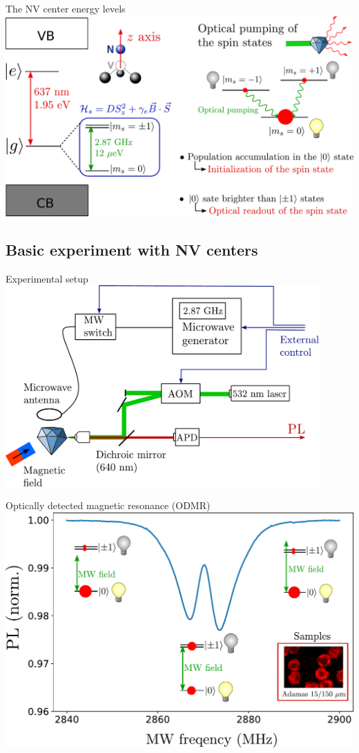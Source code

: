 \documentclass{beamer}
\begin{document}
\begin{frame}{The NV center energy levels}
\centering
\includegraphics[width=\textwidth,height=0.85\textheight,keepaspectratio]{Slide_NV_levels}
\end{frame}

\subsection{Basic experiment with NV centers}
\begin{frame}{Experimental setup}
\centering
\includegraphics[width=0.9\textwidth,height=0.85\textheight,keepaspectratio]{Slide_setup}
\end{frame}

\begin{frame}{Optically detected magnetic resonance (ODMR)}
\centering
\includegraphics[width=\textwidth,height=0.80\textheight,keepaspectratio]{Slide_ODMR_0}
\end{frame}
\end{document}
